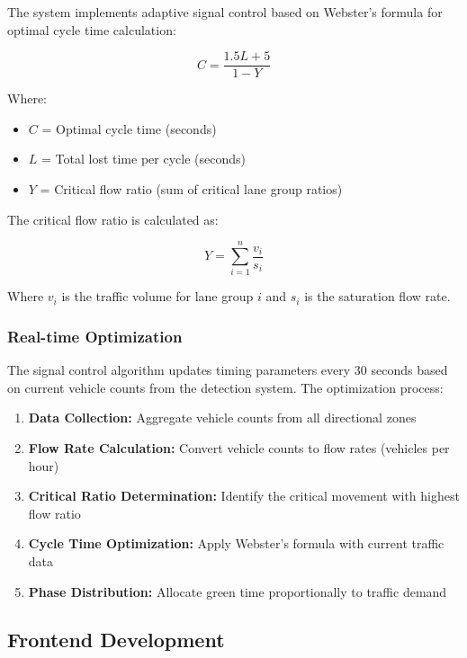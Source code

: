 \documentclass[conference]{IEEEtran}
\begin{document}
The system implements adaptive signal control based on Webster's formula for optimal cycle time calculation:

\begin{equation}
C = \frac{1.5L + 5}{1 - Y}
\end{equation}

Where:
\begin{itemize}
\item $C$ = Optimal cycle time (seconds)
\item $L$ = Total lost time per cycle (seconds)
\item $Y$ = Critical flow ratio (sum of critical lane group ratios)
\end{itemize}

The critical flow ratio is calculated as:

\begin{equation}
Y = \sum_{i=1}^{n} \frac{v_i}{s_i}
\end{equation}

Where $v_i$ is the traffic volume for lane group $i$ and $s_i$ is the saturation flow rate.

\subsubsection{Real-time Optimization}

The signal control algorithm updates timing parameters every 30 seconds based on current vehicle counts from the detection system. The optimization process:

\begin{enumerate}
\item \textbf{Data Collection:} Aggregate vehicle counts from all directional zones
\item \textbf{Flow Rate Calculation:} Convert vehicle counts to flow rates (vehicles per hour)
\item \textbf{Critical Ratio Determination:} Identify the critical movement with highest flow ratio
\item \textbf{Cycle Time Optimization:} Apply Webster's formula with current traffic data
\item \textbf{Phase Distribution:} Allocate green time proportionally to traffic demand
\end{enumerate}

\subsection{Frontend Development}
\end{document}
